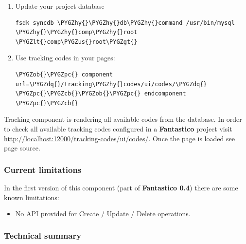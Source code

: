 \documentclass[letterpaper,10pt,english]{sphinxmanual}
\def\PYGZus{\char`\_}
\def\PYGZob{\char`\{}
\def\PYGZcb{\char`\}}
\def\PYGZlt{\char`\<}
\def\PYGZgt{\char`\>}
\def\PYGZpc{\char`\%}
\def\PYGZhy{\char`\-}
\def\PYGZdq{\char`\"}
\begin{document}
\begin{enumerate}
\item {} 
Update your project database

\begin{Verbatim}[commandchars=\\\{\}]
fsdk syncdb \PYGZhy{}\PYGZhy{}db\PYGZhy{}command /usr/bin/mysql \PYGZhy{}\PYGZhy{}comp\PYGZhy{}root \PYGZlt{}comp\PYGZus{}root\PYGZgt{}
\end{Verbatim}

\item {} 
Use tracking codes in your pages:

\begin{Verbatim}[commandchars=\\\{\}]
\PYGZob{}\PYGZpc{} component url=\PYGZdq{}/tracking\PYGZhy{}codes/ui/codes/\PYGZdq{} \PYGZpc{}\PYGZcb{}\PYGZob{}\PYGZpc{} endcomponent \PYGZpc{}\PYGZcb{}
\end{Verbatim}

\end{enumerate}

Tracking component is rendering all available codes from the database. In order to check all available tracking codes configured
in a \textbf{Fantastico} project visit \href{http://localhost:12000/tracking-codes/ui/codes/}{http://localhost:12000/tracking-codes/ui/codes/}. Once the page is loaded see page source.


\subsubsection{Current limitations}
\label{features/components/tracking_codes/tracking_codes:current-limitations}
In the first version of this component (part of \textbf{Fantastico 0.4}) there are some known limitations:
\begin{itemize}
\item {} 
No API provided for Create / Update / Delete operations.

\end{itemize}


\subsubsection{Technical summary}
\label{features/components/tracking_codes/tracking_codes:technical-summary}
\end{document}
